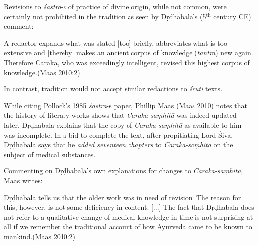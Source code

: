 Revisions to {\sl śāstra}-s of practice of divine origin, while not common, were certainly not prohibited in the tradition as seen by Dṛḍhabala's (5$^{\text{th}}$ century CE) comment:
\begin{myquote}
A redactor expands what was stated [too] briefly, abbreviates what is too extensive and [thereby] makes an ancient corpus of knowledge ({\sl tantra}) new again. Therefore Caraka, who was exceedingly intelligent, revised this highest corpus of knowledge.\hfill (Maas 2010:2)
\end{myquote}

In contrast, tradition would not accept similar redactions to {\sl śruti} texts.

While citing Pollock's 1985 {\sl śāstra}-s paper, Phillip Maas (Maas 2010) notes that the history of literary works shows that {\sl Caraka-saṃhitā} was indeed updated later.  Dṛḍhabala explains that the copy of {\sl Caraka-saṃhitā} as available to him was incomplete.  In a bid to complete the text, after propitiating Lord Śiva, Dṛḍhabala says that he {\sl added seventeen chapters} to {\sl Caraka-saṃhitā} on the subject of medical substances.

Commenting on Dṛḍhabala's own explanations for changes to {\sl Caraka-saṃhitā}, Maas writes: 
\begin{myquote}
Dṛḍhabala tells us that the older work was in need of revision. The reason for this, however, is not some deficiency in content. [...] The fact that Dṛḍhabala does not refer to a qualitative change of medical knowledge in time is not surprising at all if we remember the traditional account of how Āyurveda came to be known to mankind.\hfill (Maas 2010:2)
\end{myquote}

